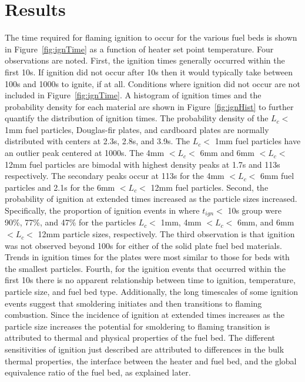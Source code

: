 \section*{Results}
   The time required for flaming ignition to occur for the various fuel beds is shown in Figure~\ref{fig:ignTime} as a function of heater set point temperature. Four observations are noted. First, the ignition times generally occurred  within the first 10\si{\second}.  If ignition did not occur after 10\si{\second} then it would typically take between 100\si{\second} and 1000\si{\second} to ignite, if at all. Conditions where ignition did not occur are not included in Figure~\ref{fig:ignTime}. A histogram of ignition times and the probability density for each material are shown in Figure~\ref{fig:ignHist} to further quantify the distribution of ignition times. The probability density of the $L_{c}<$ 1\si{\milli\meter} fuel particles, Douglas-fir plates, and cardboard plates are normally distributed with centers at 2.3\si{\second}, 2.8\si{\second}, and 3.9\si{\second}. The $L_{c}<$ 1\si{\milli\meter} fuel particles have an outlier peak centered at 1000\si{\second}. The 4\si{\milli\meter} $<L_{c}<$ 6\si{\milli\meter} and 6\si{\milli\meter} $<L_{c}<$ 12\si{\milli\meter} fuel particles are bimodal with highest density peaks at 1.7\si{\second} and 113\si{\second} respectively. The secondary peaks occur at 113\si{\second} for the 4\si{\milli\meter} $<L_{c}<$ 6\si{\milli\meter} fuel particles and 2.1\si{\second} for the 6\si{\milli\meter} $<L_{c}<$ 12\si{\milli\meter} fuel particles. Second, the probability of ignition at extended times increased as the particle sizes increased. Specifically, the proportion of ignition events in where $t_{ign} <$ 10\si{\second} group were 90\%, 77\%, and 47\% for the particles $L_{c}<$ 1\si{\milli\meter}, 4\si{\milli\meter} $<L_{c}<$ 6\si{\milli\meter}, and 6\si{\milli\meter} $<L_{c}<$ 12\si{\milli\meter} particle sizes, respectively. The third observation is that ignition was not observed beyond 100s for either of the solid plate fuel bed materials. Trends in ignition times for the plates were most similar to those for beds with the smallest particles. Fourth, for the ignition events that occurred within the first 10\si{\second} there is no apparent relationship between time to ignition, temperature, particle size, and fuel bed type. Additionally, the long timescales of some ignition events suggest that smoldering initiates and then transitions to flaming combustion. Since the incidence of ignition at extended times increases as the particle size increases the potential for smoldering to flaming transition is attributed to thermal and physical properties of the fuel bed. The different sensitivities of ignition just described are attributed to differences in the bulk thermal properties, the interface between the heater and fuel bed, and the global equivalence ratio of the fuel bed, as explained later. 
